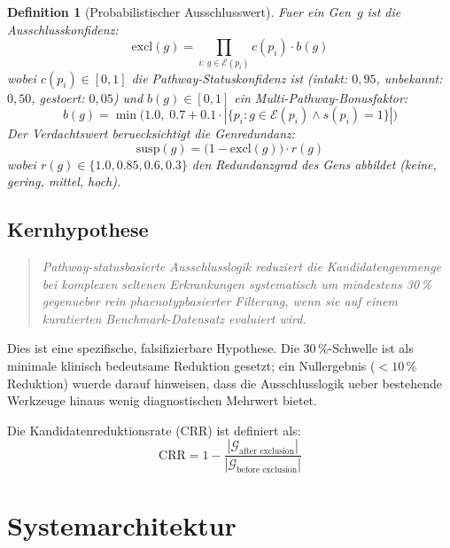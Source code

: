 \documentclass[12pt,a4paper]{article}
\newtheorem{definition}{Definition}
\begin{document}
\begin{definition}[Probabilistischer Ausschlusswert]
\label{def:probabilistic}
Fuer ein Gen~$g$ ist die Ausschlusskonfi\-denz:
\begin{equation}
    \text{excl}(g) = \prod_{i:\, g \in \mathcal{E}(p_i)} c(p_i) \cdot b(g)
\end{equation}
wobei $c(p_i) \in [0,1]$ die Pathway-Statuskonfidenz ist (intakt: $0{,}95$, unbekannt: $0{,}50$, gestoert: $0{,}05$) und $b(g) \in [0,1]$ ein Multi-Pathway-Bonusfaktor:
\begin{equation}
    b(g) = \min\!\Big(1.0,\; 0.7 + 0.1 \cdot |\{p_i : g \in \mathcal{E}(p_i) \wedge s(p_i) = 1\}|\Big)
\end{equation}
Der \emph{Verdachtswert} beruecksichtigt die Genredundanz:
\begin{equation}
    \text{susp}(g) = \big(1 - \text{excl}(g)\big) \cdot r(g)
\end{equation}
wobei $r(g) \in \{1.0, 0.85, 0.6, 0.3\}$ den Redundanzgrad des Gens abbildet (keine, gering, mittel, hoch).
\end{definition}

\subsection{Kernhypothese}

\begin{quote}
\emph{Pathway-statusbasierte Ausschlusslogik reduziert die Kandidatengenmenge bei komplexen seltenen Erkrankungen systematisch um mindestens 30\,\% gegenueber rein phaenotypbasierter Filterung, wenn sie auf einem kuratierten Benchmark-Datensatz evaluiert wird.}
\end{quote}

Dies ist eine spezifische, falsifizierbare Hypothese. Die 30\,\%-Schwelle ist als minimale klinisch bedeutsame Reduktion gesetzt; ein Nullergebnis ($<10\,\%$ Reduktion) wuerde darauf hinweisen, dass die Ausschlusslogik ueber bestehende Werkzeuge hinaus wenig diagnostischen Mehrwert bietet.

Die Kandidatenreduktionsrate (CRR) ist definiert als:
\begin{equation}
\label{eq:crr}
    \text{CRR} = 1 - \frac{|\mathcal{G}_{\text{after exclusion}}|}{|\mathcal{G}_{\text{before exclusion}}|}
\end{equation}

\section{Systemarchitektur}
\label{sec:architecture}
\end{document}
